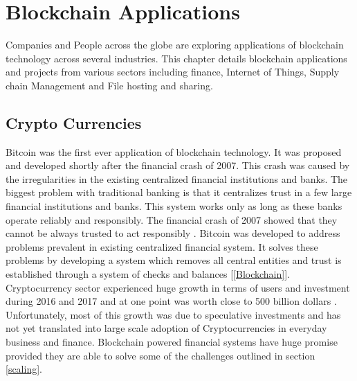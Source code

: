 \section{Blockchain Applications}
Companies and People across the globe are exploring applications of blockchain technology across several industries. This chapter details blockchain applications and projects from various sectors including finance, Internet of Things, Supply chain Management and File hosting and sharing. 
\subsection{Crypto Currencies}
Bitcoin was the first ever application of blockchain technology. It was proposed and developed shortly after the financial crash of 2007. This crash was caused by the irregularities in the existing centralized financial institutions and banks. The biggest problem with traditional banking is that it centralizes trust in a few large financial institutions and banks. This system works only as long as these banks operate reliably and responsibly. The financial crash of 2007 showed that they cannot be always trusted to act responsibly \cite{misc:009}. Bitcoin was developed to address problems prevalent in existing centralized financial system. It solves these problems by developing a system which removes all central entities and trust is established through a system of checks and balances [\ref{Blockchain}]. Cryptocurrency sector experienced huge growth in terms of users and investment during 2016 and 2017 and at one point was worth close to 500 billion dollars \cite{misc:010}. Unfortunately, most of this growth was due to speculative investments and has not yet translated into large scale adoption of Cryptocurrencies in everyday business and finance. Blockchain powered financial systems have huge promise provided they are able to solve some of the challenges outlined in section \ref{scaling}.
